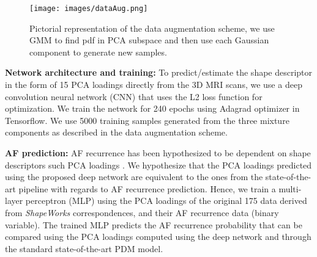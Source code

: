 \documentclass[twocolumn]{cinc}
\begin{document}
\begin{figure}
\centering
\texttt{[image: images/dataAug.png]}
\vspace{-0.2in}
\caption{Pictorial representation of the data augmentation scheme, we use GMM to find pdf in PCA subspace and then use each Gaussian component to generate new samples.}
\vspace{-0.2in}
\label{fig:data-augmentation}	
\end{figure}


\vspace{0.05in}
\noindent\textbf{Network architecture and training: }
To predict/estimate the shape descriptor in the form of 15 PCA loadings directly from the 3D MRI scans, we use a deep convolution neural network (CNN) \cite{lecun1998cnn} that uses the L2 loss function for optimization. We train the network for 240 epochs using Adagrad optimizer in Tensorflow. We use 5000 training samples generated from the three mixture components as described in the data augmentation scheme. 


\vspace{0.05in}
\noindent\textbf{AF prediction: }
AF recurrence has been hypothesized to be dependent on shape descriptors such PCA loadings \cite{marrouche2014decaaf}. We hypothesize that the PCA loadings predicted using the proposed deep network are equivalent to the ones from the state-of-the-art pipeline with regards to AF recurrence prediction. Hence, we train a multi-layer perceptron (MLP) using the PCA loadings of the original 175 data derived from \emph{ShapeWorks} correspondences, and their AF recurrence data (binary variable). The trained MLP predicts the AF recurrence probability that can be compared using the PCA loadings computed using the deep network and through the standard state-of-the-art PDM model. 
\end{document}

